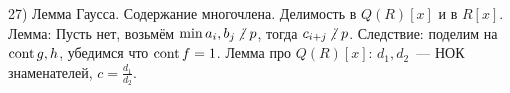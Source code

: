 27) Лемма Гаусса. Содержание многочлена. Делимость в $Q(R)[x]$ и в $R[x]$.\\
Лемма: Пусть нет, возьмём $\min a_i, b_j \ndi p$, тогда $c_{i + j} \ndi p$. Следствие: поделим на $\operatorname{cont} g, h$, убедимся что $\operatorname{cont} f = 1$. Лемма про $Q(R)[x]$: $d_1, d_2$~--- НОК знаменателей, $c = \frac{d_1}{d_2}$.\\
